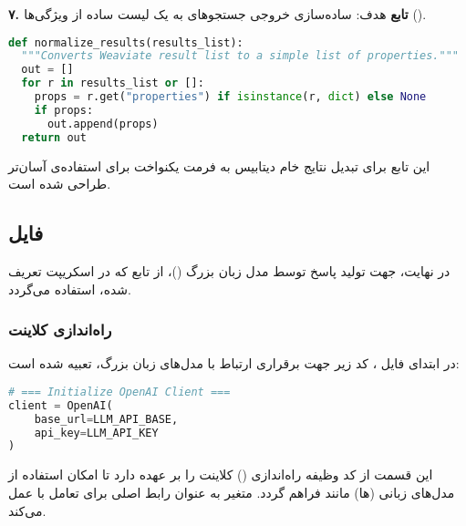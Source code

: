 \documentclass{article}
\begin{document}
\textbf{۷. تابع }
هدف: ساده‌سازی خروجی جستجوهای  به یک لیست ساده از ویژگی‌ها ().

\begin{latin}
\begin{lstlisting}[language=Python]
def normalize_results(results_list):
  """Converts Weaviate result list to a simple list of properties."""
  out = []
  for r in results_list or []:
    props = r.get("properties") if isinstance(r, dict) else None
    if props:
      out.append(props)
  return out
\end{lstlisting}
\end{latin}
این تابع برای تبدیل نتایج خام دیتابیس به فرمت یکنواخت برای استفاده‌ی آسان‌تر طراحی شده است.

\subsection{فایل }

در نهایت، جهت تولید پاسخ توسط مدل زبان بزرگ ()، از تابع  که در اسکریپت  تعریف شده، استفاده می‌گردد.

\subsubsection{راه‌اندازی کلاینت }
در ابتدای فایل ، کد زیر جهت برقراری ارتباط با مدل‌های زبان بزرگ، تعبیه شده است:

\begin{latin}
\begin{lstlisting}[language=Python]
# === Initialize OpenAI Client ===
client = OpenAI(
    base_url=LLM_API_BASE,
    api_key=LLM_API_KEY
)
\end{lstlisting}
\end{latin}

این قسمت از کد وظیفه راه‌اندازی () کلاینت  را بر عهده دارد تا امکان استفاده از مدل‌های زبانی (ها) مانند  فراهم گردد. متغیر  به عنوان رابط اصلی برای تعامل با  عمل می‌کند.
\end{document}
